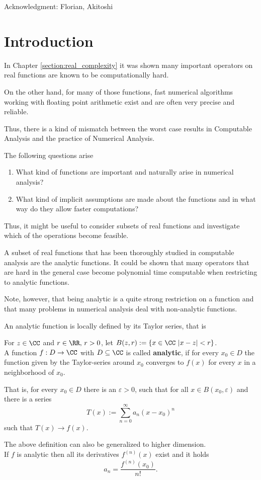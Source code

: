 	Acknowledgment: Florian, Akitoshi
	\section{Introduction}
		In Chapter \ref{section:real_complexity} it was shown many important operators 
		on real functions are known to be computationally hard.

		On the other hand, for many of those functions, fast numerical algorithms working with 
    floating point arithmetic exist and are often very precise and reliable.

    Thus, there is a kind of mismatch between the worst case results in Computable Analysis
    and the practice of Numerical Analysis. 

    The following questions arise
		\begin{enumerate}
			\item What kind of functions are important and naturally arise in numerical analysis? 
			\item What kind of implicit assumptions are made about the functions and in what way do they allow faster computations? 
		\end{enumerate}

    Thus, it might be useful to consider subsets of real functions and investigate which of the operations become feasible.

		A subset of real functions that has been thoroughly studied in computable analysis are the analytic functions.
    It could be shown that many operators that are hard in the general case become polynomial time computable when restricting 
    to analytic functions.
     
    Note, however, that being analytic is a quite strong restriction on a function and that many problems in 
    numerical analysis deal with non-analytic functions.

    An analytic function is locally defined by its Taylor series, that is
		\begin{definition}
			For $z \in \CC$ and $r \in \RR, \, r > 0$, let $B(z,r) := \{ x \in \CC \,\, | x - z | < r\}$. \\
			A function $f: D \to \CC$ with $D \subseteq \CC$ is called \textbf{analytic}, if for every $x_0 \in D$ 
			the function given by the Taylor-series around $x_0$ converges to $f(x)$ for every $x$ in a neighborhood of 
			$x_0$. 

			That is, for every $x_0 \in D$ there is an $\varepsilon > 0$, such that for all $x \in B(x_0, \varepsilon)$ and there is a series
			$$ T(x) := \sum_{n=0}^{\infty} a_n(x-x_0)^n$$
			such that $T(x) \rightarrow f(x)$.

		\end{definition}
		The above definition can also be generalized to higher dimension. \\
		If $f$ is analytic then all its derivatives $f^{(n)}(x)$ exist and it holds
		$$ a_n = \frac{f^{(n)}(x_0)}{n!}. $$    


